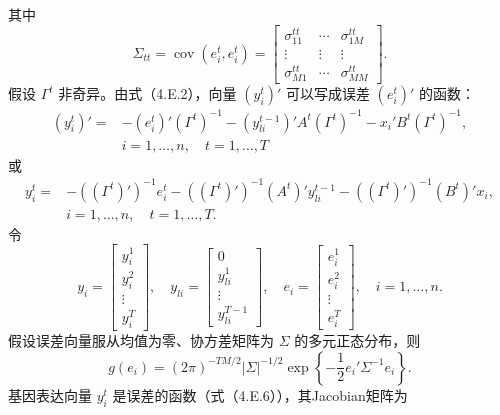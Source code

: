 其中
\begin{equation}
\Sigma_{tt}=\operatorname{cov}(e_i^t,e_i^t)=\begin{bmatrix}
\sigma_{11}^{tt}&\cdots&\sigma_{1M}^{tt}\\
\vdots&\vdots&\vdots\\\sigma_{M1}^{tt}&\cdots&\sigma_{MM}^{tt}
\end{bmatrix}.\tag{4.E.4}
\end{equation}
假设 $\Gamma^t$ 非奇异。由式（4.E.2），向量 $(y_i^t)'$ 可以写成误差 $(e_i^t)'$ 的函数：
\begin{equation}
\begin{aligned}
(y_i^t)'={}&-(e_i^t)'(\Gamma^t)^{-1}
-(y_{li}^{t-1})'A^t(\Gamma^t)^{-1}
-x_i'B^t(\Gamma^t)^{-1},\\
&i=1,\ldots,n,\quad t=1,\ldots,T
\end{aligned}\tag{4.E.5}
\end{equation}
或
\begin{equation}
\begin{aligned}
y_i^t={}&-((\Gamma^t)')^{-1}e_i^t
-((\Gamma^t)')^{-1}(A^t)'y_{li}^{t-1}
-((\Gamma^t)')^{-1}(B^t)'x_i,\\
&i=1,\ldots,n,\quad t=1,\ldots,T.
\end{aligned}\tag{4.E.6}
\end{equation}
令
\begin{equation}
y_i=\begin{bmatrix}y_i^1\\y_i^2\\\vdots\\y_i^T\end{bmatrix},\quad
y_{li}=\begin{bmatrix}0\\y_{li}^1\\\vdots\\y_{li}^{T-1}\end{bmatrix},\quad
e_i=\begin{bmatrix}e_i^1\\e_i^2\\\vdots\\e_i^T\end{bmatrix},\quad i=1,\ldots,n.\tag{4.E.7}
\end{equation}
假设误差向量服从均值为零、协方差矩阵为 $\Sigma$ 的多元正态分布，则
\begin{equation}
g(e_i)=(2\pi)^{-TM/2}|\Sigma|^{-1/2}
\exp\left\{-\frac12e_i'\Sigma^{-1}e_i\right\}.\tag{4.E.8}
\end{equation}
基因表达向量 $y_i^t$ 是误差的函数（式（4.E.6）），其Jacobian矩阵为
